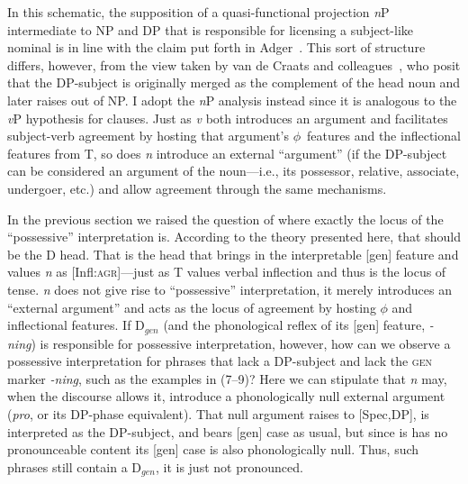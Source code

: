 \documentclass[letterpaper,12pt]{article}
\newcommand{\posst}{\textsc{agr}}
\newcommand{\gen}{\textsc{gen}}
\begin{document}
In this schematic, the supposition of a quasi-functional projection \textit{n}P intermediate to NP and DP that is responsible for licensing a subject-like nominal is in line
with the claim put forth in Adger~\citeyear{Adger}. This sort of structure differs, however, from the view
taken by van de Craats and colleagues~\citeyear{vandeCraats}, who posit that the DP-subject is originally merged as the complement of the head noun and later raises
out of NP. I adopt the \textit{n}P analysis instead since it is analogous to the \textit{v}P hypothesis for clauses. Just as \textit{v} both introduces an argument
and facilitates subject-verb agreement by hosting that argument's \mbox{$\phi$ features} and the inflectional features from T, so does \textit{n} introduce an external ``argument''
(if the DP-subject can be considered an argument of the noun---i.e., its possessor, relative, associate, undergoer, etc.) and allow agreement through the same mechanisms.

In the previous section we raised the question of where exactly the locus of the ``possessive'' interpretation is. According to the theory presented here, that
should be the D head. That is the head that brings in the interpretable [gen] feature and values \textit{n} as [Infl:\posst]---just as T values verbal inflection and
thus is the locus of tense. \textit{n} does not give rise to ``possessive'' interpretation, it merely introduces an
``external argument'' and acts as the locus of agreement by hosting $\phi$ and inflectional features. If D$_{gen}$ (and the phonological reflex of its [gen] feature, \textsl{-ning}) is responsible for possessive interpretation, however, how can we observe a possessive interpretation for phrases that lack a DP-subject and lack the \gen{} marker \textsl{-ning}, such as the examples in (7--9)? Here we can stipulate that \textit{n} may, when the discourse allows it, introduce a phonologically null external argument (\textit{pro}, or its DP-phase equivalent). That null argument raises to [Spec,DP], is interpreted as the DP-subject,
and bears [gen] case as usual, but since is has no pronounceable content its [gen] case is also phonologically null. Thus, such phrases still contain a D$_{gen}$,
it is just not pronounced.
\end{document}
